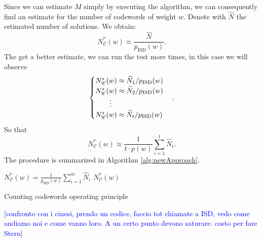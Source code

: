 
Since we can estimate $M$ simply by executing the algorithm, we can consequently find an estimate for the number of codewords of weight $w$. Denote with $\widehat{N}$ the estimated number of solutions. We obtain:
\begin{equation}
     N^{*}_{\mathscr{C}}(w) \approx \frac{\widehat{N}}{p_{\text{ISD}}(w)}.
\end{equation}
The get a better estimate, we can run the test more times, in this case we will observe
\begin{equation*}
\begin{cases}
N^{*}_{\mathscr{C}}(w) \approx \widehat N_1 / p_{\text{ISD}}(w) \\
N^{*}_{\mathscr{C}}(w) \approx \widehat N_2 / p_{\text{ISD}}(w) \\
\hspace{0.7cm} \vdots \\
N^{*}_{\mathscr{C}}(w) \approx \widehat N_t / p_{\text{ISD}}(w)
\end{cases}.
\end{equation*}
So that
\begin{equation}
    N^{*}_{\mathscr{C}}(w) \approx \frac{1}{t \cdot p(w)} \sum_{i=1}^{t} \widehat N_i.
\end{equation}
The procedure is summarized in Algorithm \ref{alg:newApproach}.

\begin{algorithm}[ht]
\vspace{2mm}
$N^*_{\mathscr C}(w) = \frac{1}{p_{\mathsf{ISD}}(w)}\sum_{i = 1}^m \widehat N_i$\;
\Return $N^{*}_{\mathscr{C}}(w)$
\caption{Counting codewords operating principle}
\label{alg:newApproach}
\end{algorithm}

\textcolor{blue}{[confronto con i cinesi, prendo un codice, faccio tot chiamate a ISD, vedo come andiamo noi e come vanno loro. A un certo punto devono saturare. costo per fare Stern]}
